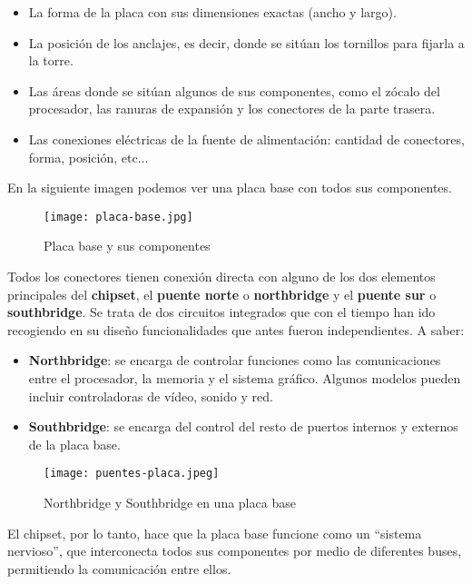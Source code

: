 \begin{itemize}
    \item La forma de la placa con sus dimensiones exactas (ancho y largo).
    \item La posición de los anclajes, es decir, donde se sitúan los tornillos para fijarla a la torre.
    \item Las áreas donde se sitúan algunos de sus componentes, como el zócalo del procesador, las ranuras de expansión y los conectores de la parte trasera.
    \item Las conexiones eléctricas de la fuente de alimentación: cantidad de conectores, forma, posición, etc...
\end{itemize}

En la siguiente imagen podemos ver una placa base con todos sus componentes.

\begin{figure}[ht]
    \centering
    \texttt{[image: placa-base.jpg]}
    \caption{Placa base y sus componentes}
\end{figure}

Todos los conectores tienen conexión directa con alguno de los dos elementos principales del \textbf{chipset}, el \textbf{puente norte} o \textbf{northbridge} y el \textbf{puente sur} o \textbf{southbridge}. Se trata de dos circuitos integrados que con el tiempo han ido recogiendo en su diseño funcionalidades que antes fueron independientes. A saber:

\begin{itemize}
    \item \textbf{Northbridge}: se encarga de controlar funciones como las comunicaciones entre el procesador, la memoria y el sistema gráfico. Algunos modelos pueden incluir controladoras de vídeo, sonido y red.
    \item \textbf{Southbridge}: se encarga del control del resto de puertos internos y externos de la placa base.
\end{itemize}

\begin{figure}[ht]
    \centering
    \texttt{[image: puentes-placa.jpeg]}
    \caption{Northbridge y Southbridge en una placa base}
\end{figure}

El chipset, por lo tanto, hace que la placa base funcione como un ``sistema nervioso'', que interconecta todos sus componentes por medio de diferentes buses, permitiendo la comunicación entre ellos.

